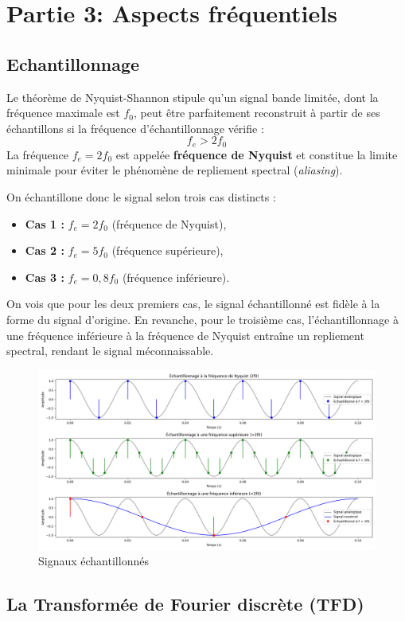 \section{Partie 3: Aspects fréquentiels}
\subsection{Echantillonnage}


Le théorème de Nyquist-Shannon stipule qu’un signal bande limitée, dont la fréquence maximale est $f_0$, peut être parfaitement reconstruit à partir de ses échantillons si la fréquence d’échantillonnage vérifie :
\[
f_e > 2 f_0
\]
La fréquence $f_e = 2 f_0$ est appelée \textbf{fréquence de Nyquist} et constitue la limite minimale pour éviter le phénomène de repliement spectral (\textit{aliasing}).

On échantillone donc le signal selon trois cas distincts :

\begin{itemize}
    \item \textbf{Cas 1 :} $f_e = 2f_0$ (fréquence de Nyquist),
    \item \textbf{Cas 2 :} $f_e = 5f_0$ (fréquence supérieure),
    \item \textbf{Cas 3 :} $f_e = 0{,}8f_0$ (fréquence inférieure).
\end{itemize}

On vois que pour les deux premiers cas, le signal échantillonné est fidèle à la forme du signal d’origine. En revanche, pour le troisième cas, l’échantillonnage à une fréquence inférieure à la fréquence de Nyquist entraîne un repliement spectral, rendant le signal méconnaissable.
\begin{figure}[h!]
    \centering
    \includegraphics[width=17cm]{screenshots/echantillonage_partie3.png}
    \caption{Signaux échantillonnés}
\end{figure}

\subsection{La Transformée de Fourier discrète (TFD)}
